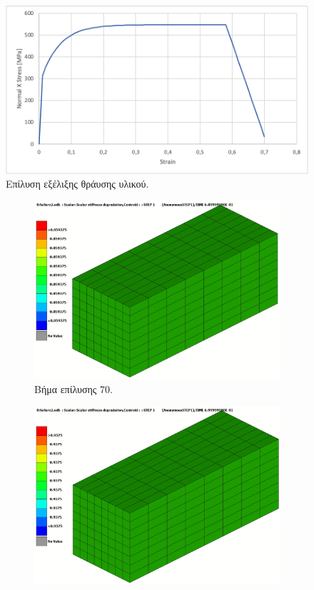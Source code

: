 \documentclass{article}
\begin{document}
\begin{figure}[H]
    \centering
    \includegraphics[width=0.7\linewidth]{media/fracture.png}
    \caption{Επίλυση εξέλιξης θράυσης υλικού.}
    \label{fig:fracture}
\end{figure}


\begin{figure}[H]
    \centering
    \begin{subfigure}{0.3\linewidth}
        \centering
        \includegraphics[width=\linewidth]{media/sdeg1.png}
        \caption{Βήμα επίλυσης 70.}
        \label{fig:label1}
    \end{subfigure}
    \hfill
    \begin{subfigure}{0.3\linewidth}
        \centering
        \includegraphics[width=\linewidth]{media/sdeg2.png}

\end{subfigure}
\end{figure}
\end{document}
